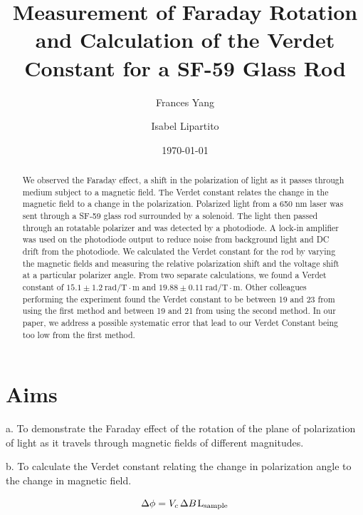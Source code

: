 \documentclass[prb,preprint]{revtex4-1}
\begin{document}
\title{Measurement of Faraday Rotation and Calculation of the Verdet Constant for a SF-59 Glass Rod}

\author{Frances Yang}

\author{Isabel Lipartito}

\date{\today}

\begin{abstract}
{We observed the Faraday effect, a shift in the polarization of light as it passes through medium subject to a magnetic field. The Verdet constant relates the change in the magnetic field to a change in the polarization.  Polarized light from a 650 nm laser was sent through a SF-59 glass rod surrounded by a solenoid. The light then passed through an rotatable polarizer and was detected by a photodiode. A lock-in amplifier was used on the photodiode output to reduce noise from background light and DC drift from the photodiode. We calculated the Verdet constant for the rod by varying the magnetic fields and measuring the relative polarization shift and the voltage shift at a particular polarizer angle. From two separate calculations, we found a Verdet constant of $15.1 \pm 1.2 \mathrm{~rad/T} \cdot \textrm{m}$ and $19.88 \pm 0.11 \mathrm{~rad/T} \cdot \textrm{m}$. Other colleagues performing the experiment found the Verdet constant to be between 19 and 23 from using the first method and between 19 and 21 from using the second method.  In our paper, we address a possible systematic error that lead to our Verdet Constant being too low from the first method.

}
\end{abstract}

\maketitle 
\section{Aims}
{a.  To demonstrate the Faraday effect of the rotation of the plane of polarization of light as it travels through magnetic fields of different magnitudes.

b.  To calculate the Verdet constant relating the change in polarization angle to the change in magnetic field.}
\begin{equation}
\Delta \phi =V_{c}\hspace{1.5pt} \Delta B\hspace{1pt}\textrm{L}{_{\textrm{sample}}}
\end{equation}
\end{document}
